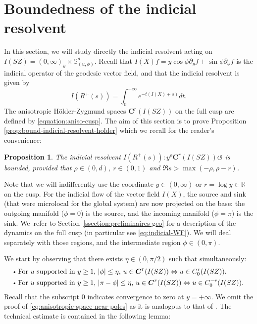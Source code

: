 \documentclass[JEP,XML,SOM,Unicode,NoFloatCountersInSection]{cedram}
\newcommand{\sbullet}{{\scriptscriptstyle\bullet}}
\newcommand{\csbullet}{{\raisebox{1pt}{$\sbullet$}}}
\newcommand{\bC}{\boldsymbol{C}}
\newcommand{\R}{\mathbb{R}}
\newcommand{\Ss}{\mathbb{S}}
\newcommand{\ZZ}{I(SZ)}
\theoremstyle{plain}
\newtheorem{proposition}{Proposition}[section]
\theoremstyle{definition}
\begin{document}
\section{Boundedness of the indicial resolvent}

\label{appendix:c}

In this section, we will study directly the indicial resolvent acting on $\ZZ=(0,\infty)_y \times \Ss^d_{(u,\phi)}$. Recall that $I(X)f = y \cos \phi \partial_y f + \sin\phi\partial_\phi f$ is the indicial operator of the geodesic vector field, and that the indicial resolvent is given by
\[
I(R^+(s)) = \int_0^{+\infty} e^{-t(I(X)+s)} dt.
\]
The anisotropic Hölder-Zygmund spaces $\bC^r(\ZZ)$ on the full cusp are defined by \eqref{equation:aniso-cusp}. The aim of this section is to prove Proposition \ref{prop:bound-indicial-resolvent-holder} which we recall for the reader's convenience:
\begin{proposition}
The indicial resolvent $I(R^+(s)): y^\rho \bC^r(\ZZ) \circlearrowleft$ is bounded, provided that $\rho \in (0,d)$, $r \in (0,1)$ and $\Re s > \max(-\rho,\rho-r)$.
\end{proposition}

Note that we will indifferently use the coordinate $y \in (0,\infty)$ or $r = \log y \in \R$ on the cusp. For the indicial flow of the vector field $I(X)$, the source and sink (that were microlocal for the global system) are now projected on the base: the outgoing manifold ($\phi=0$) is the source, and the incoming manifold ($\phi=\pi$) is the sink. We~refer to Section~\ref{ssection:preliminaires-geo} for a description of the dynamics on the full cusp (in particular see \eqref{eq:indicial-WF}). We will deal separately with those regions, and the intermediate region $\phi\in (0,\pi)$.

We start by observing that there exists $\eta \in (0,\pi/2)$ such that simultaneously:
\begin{equation}\label{eq:anisotropic-space-near-poles}
\begin{split}
&\csbullet \text{ For $u$ supported in $y\geq 1$, $|\phi|\leq \eta$, $u \in \bC^r(\ZZ) \Leftrightarrow u\in C^r_0(\ZZ)$}.\\
&\csbullet \text{ For $u$ supported in $y\geq 1$, $|\pi-\phi|\leq \eta$, $u\in\bC^r(\ZZ) \Leftrightarrow u\in C^{-r}_0(\ZZ)$.}
\end{split}
\end{equation}
Recall that the subscript $0$ indicates convergence to zero at $y=+\infty$. We omit the proof of \eqref{eq:anisotropic-space-near-poles} as it is analogous to that of \cite[Lem.\,5.3]{Bonthonneau-Weich-17}. The technical estimate is contained in the following lemma:
\end{document}

